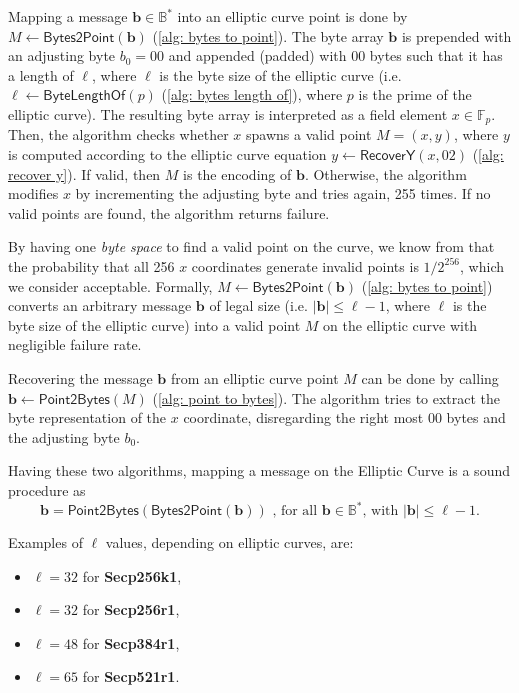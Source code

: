 Mapping a message $\boldsymbol{b} \in \mathbb{B}^*$ into an elliptic curve point is done by $M \gets \mathsf{Bytes2Point}(\boldsymbol{b})$ (\cref{alg: bytes to point}). The byte array $\boldsymbol{b}$ is prepended with an adjusting byte $b_0 = 00$ and appended (padded) with $00$ bytes such that it has a length of $\ell$, where $\ell$ is the byte size of the elliptic curve (i.e. $\ell \gets \mathsf{ByteLengthOf}(p)$ (\cref{alg: bytes length of}), where $p$ is the prime of the elliptic curve). The resulting byte array is interpreted as a field element $x \in \mathbb{F}_p$. Then, the algorithm checks whether $x$ spawns a valid point $M = (x, y)$, where $y$ is computed according to the elliptic curve equation $y \gets \mathsf{RecoverY}(x, 02)$ (\cref{alg: recover y}). If valid, then $M$ is the encoding of $\boldsymbol{b}$. Otherwise, the algorithm modifies $x$ by incrementing the adjusting byte and tries again, 255 times. If no valid points are found, the algorithm returns failure.

By having one \textit{byte space} to find a valid point on the curve, we know from \cite{Trappe05} that the probability that all 256 $x$ coordinates generate invalid points is $1/2^{256}$, which we consider acceptable. Formally, $M \gets \mathsf{Bytes2Point}(\boldsymbol{b})$ (\cref{alg: bytes to point}) converts an arbitrary message $\boldsymbol{b}$ of legal size (i.e. $|\boldsymbol{b}| \leq \ell - 1$, where $\ell$ is the byte size of the elliptic curve) into a valid point $M$ on the elliptic curve with negligible failure rate.

Recovering the message $\boldsymbol{b}$ from an elliptic curve point $M$ can be done by calling $\boldsymbol{b} \gets \mathsf{Point2Bytes}(M)$ (\cref{alg: point to bytes}). The algorithm tries to extract the byte representation of the $x$ coordinate, disregarding the right most $00$ bytes and the adjusting byte $b_0$.

Having these two algorithms, mapping a message on the Elliptic Curve is a sound procedure as
\[ \boldsymbol{b} = \mathsf{Point2Bytes}(\mathsf{Bytes2Point}(\boldsymbol{b})) \text{ , for all $\boldsymbol{b} \in \mathbb{B}^*$, with $|\boldsymbol{b}| \leq \ell - 1$.} \]

Examples of $\ell$ values, depending on elliptic curves, are:
\begin{itemize}
    \item $\ell = 32$ for \textbf{Secp256k1},
    \item $\ell = 32$ for \textbf{Secp256r1},
    \item $\ell = 48$ for \textbf{Secp384r1},
    \item $\ell = 65$ for \textbf{Secp521r1}.
\end{itemize}

